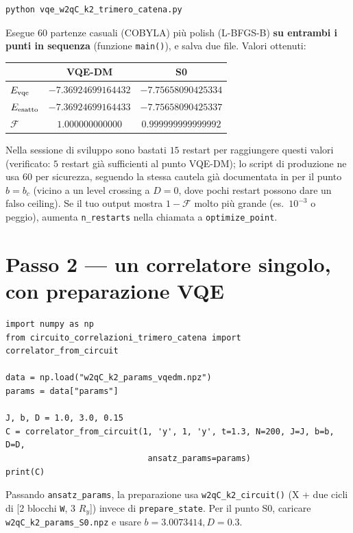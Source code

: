 \documentclass[11pt,a4paper]{article}
\begin{document}
\begin{verbatim}
python vqe_w2qC_k2_trimero_catena.py
\end{verbatim}
Esegue $60$ partenze casuali (COBYLA) più polish (L-BFGS-B) \textbf{su entrambi i punti in
sequenza} (funzione \texttt{main()}), e salva due file. Valori ottenuti:
\begin{center}
\begin{tabular}{lcc}
\toprule
& VQE-DM & S0 \\
\midrule
$E_{\rm vqe}$ & $-7.36924699164432$ & $-7.75658090425334$ \\
$E_{\rm esatto}$ & $-7.36924699164433$ & $-7.75658090425337$ \\
$\mathcal F$ & $1.000000000000$ & $0.999999999999992$ \\
\bottomrule
\end{tabular}
\end{center}
Nella sessione di sviluppo sono bastati $15$ restart per raggiungere questi valori (verificato:
$5$ restart già sufficienti al punto VQE-DM); lo script di produzione ne usa $60$ per
sicurezza, seguendo la stessa cautela già documentata in
\texttt{} per il punto $b=b_c$ (vicino a un level
crossing a $D=0$, dove pochi restart possono dare un falso ceiling). Se il tuo output mostra
$1-\mathcal F$ molto più grande (es.\ $10^{-3}$ o peggio), aumenta \texttt{n\_restarts} nella
chiamata a \texttt{optimize\_point}.

\section*{Passo 2 --- un correlatore singolo, con preparazione VQE}

\begin{verbatim}
import numpy as np
from circuito_correlazioni_trimero_catena import correlator_from_circuit

data = np.load("w2qC_k2_params_vqedm.npz")
params = data["params"]

J, b, D = 1.0, 3.0, 0.15
C = correlator_from_circuit(1, 'y', 1, 'y', t=1.3, N=200, J=J, b=b, D=D,
                             ansatz_params=params)
print(C)
\end{verbatim}
Passando \texttt{ansatz\_params}, la preparazione usa \texttt{w2qC\_k2\_circuit()} (X + due
cicli di [2 blocchi \texttt{W}, 3 $R_y$]) invece di \texttt{prepare\_state}. Per il punto S0,
caricare \texttt{w2qC\_k2\_params\_S0.npz} e usare $b{=}3.0073414, D{=}0.3$.
\end{document}
